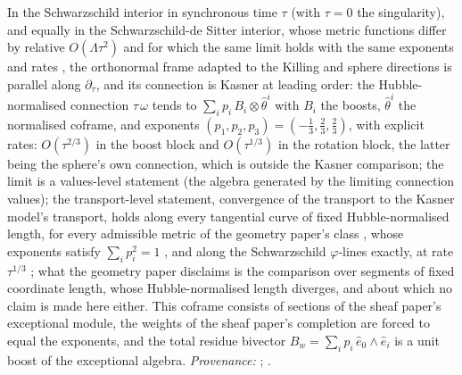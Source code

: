 In the Schwarzschild interior in synchronous time $\tau$ (with $\tau = 0$ the singularity), and equally in the Schwarzschild-de Sitter interior, whose metric functions differ by relative $O(\Lambda\tau^2)$ and for which the same limit holds with the same exponents and rates \cite[Thm.~5.9]{ButlerT6}, the orthonormal frame adapted to the Killing and sphere directions is parallel along $\partial_\tau$, and its connection is Kasner at leading order: the Hubble-normalised connection $\tau\,\omega$ tends to $\sum_i p_i\, B_i \otimes \hat\theta^i$ with $B_i$ the boosts, $\hat\theta^i$ the normalised coframe, and exponents $(p_1, p_2, p_3) = (-\tfrac13, \tfrac23, \tfrac23)$, with explicit rates: $O(\tau^{2/3})$ in the boost block and $O(\tau^{1/3})$ in the rotation block, the latter being the sphere's own connection, which is outside the Kasner comparison; the limit is a values-level statement (the algebra generated by the limiting connection values); the transport-level statement, convergence of the transport to the Kasner model's transport, holds along every tangential curve of fixed Hubble-normalised length, for every admissible metric of the geometry paper's class \cite[Def.~5.5]{ButlerT6}, whose exponents satisfy $\sum_i p_i^2 = 1$ \cite[Thm.~5.11]{ButlerT6}, and along the Schwarzschild $\varphi$-lines exactly, at rate $\tau^{1/3}$ \cite[Cor.~5.12]{ButlerT6}; what the geometry paper disclaims is the comparison over segments of fixed coordinate length, whose Hubble-normalised length diverges, and about which no claim is made here either. This coframe consists of sections of the sheaf paper's exceptional module, the weights of the sheaf paper's completion are forced to equal the exponents, and the total residue bivector $B_w = \sum_i p_i\, \hat e_0\wedge\hat e_i$ is a unit boost of the exceptional algebra. \emph{Provenance:} \cite[Lems.~5.1-5.4, Def.~5.5, Thm.~5.6, Thm.~5.9, Thm.~5.11, Cor.~5.12]{ButlerT6}; \cite[Thm.~8.16, Prop.~8.26, Thm.~8.27]{ButlerT4}.
